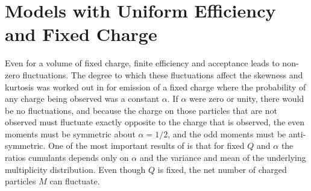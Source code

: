 
\section{Models with Uniform Efficiency and Fixed Charge}\label{sec:uniformeff}

Even for a volume of fixed charge, finite efficiency and acceptance leads to non-zero fluctuations. The degree to which these fluctuations affect the skewness and kurtosis was worked out in \cite{Savchuk:2019xfg} for emission of a fixed charge where the probability of any charge being observed was a constant $\alpha$. If $\alpha$ were zero or unity, there would be no fluctuations, and because the charge on those particles that are not observed must fluctuate exactly opposite to the charge that is observed, the even moments must be symmetric about $\alpha=1/2$, and the odd moments must be anti-symmetric. One of the most important results of \cite{Savchuk:2019xfg} is that for fixed $Q$ and $\alpha$ the ratios cumulants depends only on $\alpha$ and the variance and mean of the underlying multiplicity distribution. Even though $Q$ is fixed, the net number of charged particles $M$ can fluctuate. 

